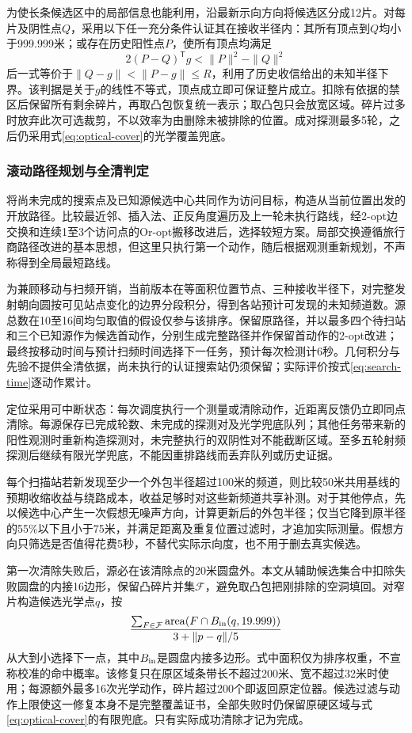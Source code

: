 \documentclass{JXUSTmodeling}
\begin{document}
为使长条候选区中的局部信息也能利用，沿最新示向方向将候选区分成12片。对每片及阴性点$Q$，采用以下任一充分条件认证其在接收半径内：其所有顶点到$Q$均小于999.999米；或存在历史阳性点$P$，使所有顶点均满足
\begin{equation}
 2(P-Q)^{\mathsf T}g<\|P\|^2-\|Q\|^2
 \label{eq:relative-reception}
\end{equation}
后一式等价于$\|Q-g\|<\|P-g\|\le R$，利用了历史收信给出的未知半径下界。该判据是关于$g$的线性不等式，顶点成立即可保证整片成立。扣除有依据的禁区后保留所有剩余碎片，再取凸包恢复统一表示；取凸包只会放宽区域。碎片过多时放弃此次可选裁剪，不以效率为由删除未被排除的位置。成对探测最多5轮，之后仍采用式\eqref{eq:optical-cover}的光学覆盖兜底。

\subsubsection{滚动路径规划与全清判定}
将尚未完成的搜索点及已知源候选中心共同作为访问目标，构造从当前位置出发的开放路径。比较最近邻、插入法、正反角度遍历及上一轮未执行路线，经2-opt边交换和连续1至3个访问点的Or-opt搬移改进后，选择较短方案。局部交换遵循旅行商路径改进的基本思想\cite{croes1958}，但这里只执行第一个动作，随后根据观测重新规划，不声称得到全局最短路线。

为兼顾移动与扫频开销，当前版本在等面积位置节点、三种接收半径下，对完整发射朝向圆按可见站点变化的边界分段积分，得到各站预计可发现的未知频道数。源总数在10至16间均匀取值的假设仅参与该排序。保留原路径，并以最多四个待扫站和三个已知源作为候选首动作，分别生成完整路径并作保留首动作的2-opt改进；最终按移动时间与预计扫频时间选择下一任务，预计每次检测计6秒。几何积分与先验不提供全清依据，尚未执行的认证搜索站仍须保留；实际评价按式\eqref{eq:search-time}逐动作累计。

定位采用可中断状态：每次调度执行一个测量或清除动作，近距离反馈仍立即同点清除。每源保存已完成轮数、未完成的探测对及光学兜底队列；其他任务带来新的阳性观测时重新构造探测对，未完整执行的双阴性对不能截断区域。至多五轮射频探测后继续有限光学兜底，不能因重排路线而丢弃队列或历史证据。

每个扫描站若新发现至少一个外包半径超过100米的频道，则比较50米共用基线的预期收缩收益与绕路成本，收益足够时对这些新频道共享补测。对于其他停点，先以候选中心产生一次假想无噪声方向，计算更新后的外包半径；仅当它降到原半径的55\%以下且小于75米，并满足距离及重复位置过滤时，才追加实际测量。假想方向只筛选是否值得花费5秒，不替代实际示向度，也不用于删去真实候选。

第一次清除失败后，源必在该清除点的20米圆盘外。本文从辅助候选集合中扣除失败圆盘的内接16边形，保留凸碎片并集$\mathcal F$，避免取凸包把刚排除的空洞填回。对窄片构造候选光学点$q$，按
\begin{equation}
 \frac{\sum_{F\in\mathcal F}\operatorname{area}(F\cap B_{\rm in}(q,19.999))}
 {3+\|p-q\|/5}
 \label{eq:unionmass}
\end{equation}
从大到小选择下一点，其中$B_{\rm in}$是圆盘内接多边形。式中面积仅为排序权重，不宣称校准的命中概率。该修复只在原区域条带长不超过200米、宽不超过32米时使用；每源额外最多16次光学动作，碎片超过200个即返回原定位器。候选过滤与动作上限使这一修复本身不是完整覆盖证书，全部失败时仍保留原硬区域与式\eqref{eq:optical-cover}的有限兜底。只有实际成功清除才记为完成。
\end{document}
